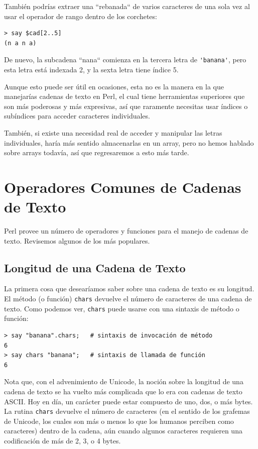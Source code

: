 También podrías extraer una ``rebanada`` de varios caracteres
de una sola vez al usar el operador de rango dentro de los 
corchetes:

\begin{lstlisting}
> say $cad[2..5]
(n a n a)
\end{lstlisting}
%
De nuevo, la subcadena ``nana`` comienza en la tercera letra
de \verb|'banana'|, pero esta letra está indexada 2, y la
sexta letra tiene índice 5.

Aunque esto puede ser útil en ocasiones, esta no es la manera
en la que manejarías cadenas de texto en Perl, el cual tiene
herramientas superiores que son más poderosas y más 
expresivas, así que raramente necesitas usar índices o 
subíndices para acceder caracteres individuales.

También, si existe una necesidad real de acceder y manipular
las letras individuales, haría más sentido almacenarlas en un 
array, pero no hemos hablado sobre arrays todavía, así que
regresaremos a esto más tarde.

\section{Operadores Comunes de Cadenas de Texto}

Perl provee un número de operadores y funciones para el 
manejo de cadenas de texto. Revisemos algunos de los más 
populares.

\subsection{Longitud de una Cadena de Texto}

La primera cosa que desearíamos saber sobre una cadena de texto 
es su longitud. El método (o función) {\tt chars} devuelve el número de
caracteres de una cadena de texto. Como podemos ver, {\tt chars} puede
usarse con una sintaxis de método o función:

\begin{lstlisting}
> say "banana".chars;   # sintaxis de invocación de método
6
> say chars "banana";   # sintaxis de llamada de función
6
\end{lstlisting}
%

Nota que, con el advenimiento de Unicode, la noción 
sobre la longitud de una cadena de texto se ha vuelto 
más complicada que lo era con cadenas de texto ASCII.
Hoy en día, un carácter puede estar compuesto de uno, dos, o 
más bytes. La rutina {\tt chars} devuelve el número de 
caracteres (en el sentido de los grafemas de Unicode, los cuales
son más o menos lo que los humanos perciben como caracteres) dentro
de la cadena, aún cuando algunos caracteres requieren una
codificación de más de 2, 3, o 4 bytes.

